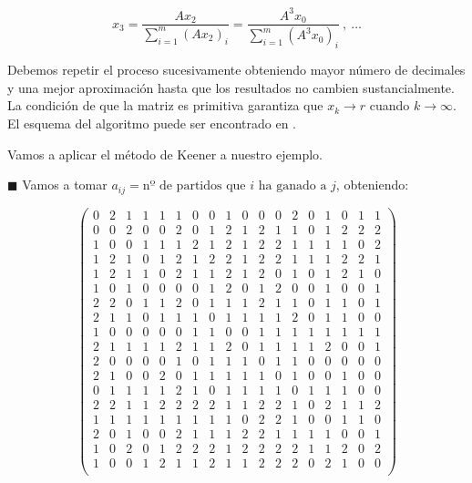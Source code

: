 \begin{equation*}
x_{3}=\dfrac{Ax_{2}}{\sum_{i=1}^{m}(Ax_{2})_{i}} = \dfrac{A^{3}x_{0}}{\sum_{i=1}^{m}(A^{3}x_{0})_{i}} \ , \ \dots
\end{equation*}

Debemos repetir el proceso sucesivamente obteniendo mayor número de decimales y una mejor aproximación hasta que los resultados no cambien sustancialmente. La condición de que la matriz es primitiva garantiza que $x_{k} \rightarrow r$ cuando $k \rightarrow \infty$.\\
El esquema del algoritmo puede ser encontrado en \cite{power_method}.

\begin{ejem} Vamos a aplicar el método de Keener a nuestro ejemplo.\\
\end{ejem}
	$\blacksquare $ Vamos a tomar $a_{ij} = \text{nº de partidos que } i \text{ ha ganado a } j $, obteniendo:
	
{\tiny 	\[
	\left(\begin{array}{cccccccccccccccccc}
	0 & 2 & 1 & 1 & 1 & 1 & 0 & 0 & 1 & 0 & 0 & 0 & 2 & 0 & 1 & 0 & 1 & 1\\
	0 & 0 & 2 & 0 & 0 & 2 & 0 & 1 & 2 & 1 & 2 & 1 & 1 & 0 & 1 & 2 & 2 & 2\\
	1 & 0 & 0 & 1 & 1 & 1 & 2 & 1 & 2 & 1 & 2 & 2 & 1 & 1 & 1 & 1 & 0 & 2\\
	1 & 2 & 1 & 0 & 1 & 2 & 1 & 2 & 2 & 1 & 2 & 2 & 1 & 1 & 1 & 2 & 2 & 1\\
	1 & 2 & 1 & 1 & 0 & 2 & 1 & 1 & 2 & 1 & 2 & 0 & 1 & 0 & 1 & 2 & 1 & 0\\
	1 & 0 & 1 & 0 & 0 & 0 & 0 & 1 & 2 & 0 & 1 & 2 & 0 & 0 & 1 & 0 & 0 & 1\\
	2 & 2 & 0 & 1 & 1 & 2 & 0 & 1 & 1 & 1 & 2 & 1 & 1 & 0 & 1 & 1 & 0 & 1\\
	2 & 1 & 1 & 0 & 1 & 1 & 1 & 0 & 1 & 1 & 1 & 1 & 2 & 0 & 1 & 1 & 0 & 0\\
	1 & 0 & 0 & 0 & 0 & 0 & 1 & 1 & 0 & 0 & 1 & 1 & 1 & 1 & 1 & 1 & 1 & 1\\
	2 & 1 & 1 & 1 & 1 & 2 & 1 & 1 & 2 & 0 & 1 & 1 & 1 & 1 & 2 & 0 & 0 & 1\\
	2 & 0 & 0 & 0 & 0 & 1 & 0 & 1 & 1 & 1 & 0 & 1 & 1 & 0 & 0 & 0 & 0 & 0\\
	2 & 1 & 0 & 0 & 2 & 0 & 1 & 1 & 1 & 1 & 1 & 0 & 1 & 0 & 0 & 1 & 0 & 0\\
	0 & 1 & 1 & 1 & 1 & 2 & 1 & 0 & 1 & 1 & 1 & 1 & 0 & 1 & 1 & 1 & 0 & 0\\
	2 & 2 & 1 & 1 & 2 & 2 & 2 & 2 & 1 & 1 & 2 & 2 & 1 & 0 & 2 & 1 & 1 & 2\\
	1 & 1 & 1 & 1 & 1 & 1 & 1 & 1 & 1 & 0 & 2 & 2 & 1 & 0 & 0 & 1 & 1 & 0\\
	2 & 0 & 1 & 0 & 0 & 2 & 1 & 1 & 1 & 2 & 2 & 1 & 1 & 1 & 1 & 0 & 0 & 1\\
	1 & 0 & 2 & 0 & 1 & 2 & 2 & 2 & 1 & 2 & 2 & 2 & 2 & 1 & 1 & 2 & 0 & 2\\
	1 & 0 & 0 & 1 & 2 & 1 & 1 & 2 & 1 & 1 & 2 & 2 & 2 & 0 & 2 & 1 & 0 & 0\\
	\end{array} \right) 
	\]}
	
